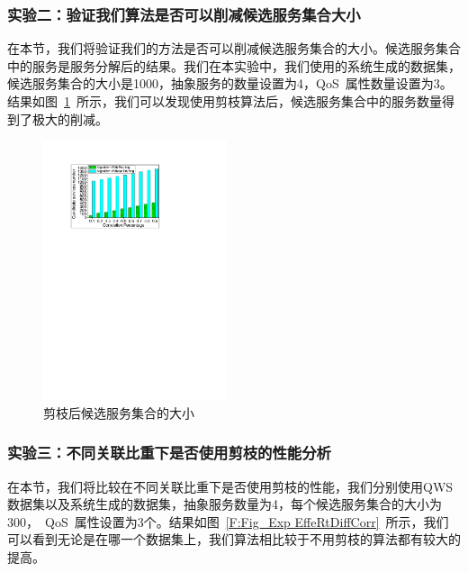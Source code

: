 \subsubsection{实验二：验证我们算法是否可以削减候选服务集合大小}

在本节，我们将验证我们的方法是否可以削减候选服务集合的大小。候选服务集合中的服务是服务分解后的结果。我们在本实验中，我们使用的系统生成的数据集，候选服务集合的大小是1000，抽象服务的数量设置为4，QoS~属性数量设置为3。结果如图~\ref{F:Fig_Exp_EffiCand}~所示，我们可以发现使用剪枝算法后，候选服务集合中的服务数量得到了极大的削减。

\begin{figure}[!thb]
    \centering
    \includegraphics[width=0.48\textwidth]{./FIGs/Experiments/csky_computing/Fig_EffiCand.pdf}
    \caption{剪枝后候选服务集合的大小}
    \label{F:Fig_Exp_EffiCand}
\end{figure}


\subsubsection{实验三：不同关联比重下是否使用剪枝的性能分析}

在本节，我们将比较在不同关联比重下是否使用剪枝的性能，我们分别使用QWS 数据集以及系统生成的数据集，抽象服务数量为4，每个候选服务集合的大小为300，~QoS~属性设置为3个。结果如图~\ref{F:Fig_Exp EffeRtDiffCorr}~所示，我们可以看到无论是在哪一个数据集上，我们算法相比较于不用剪枝的算法都有较大的提高。

